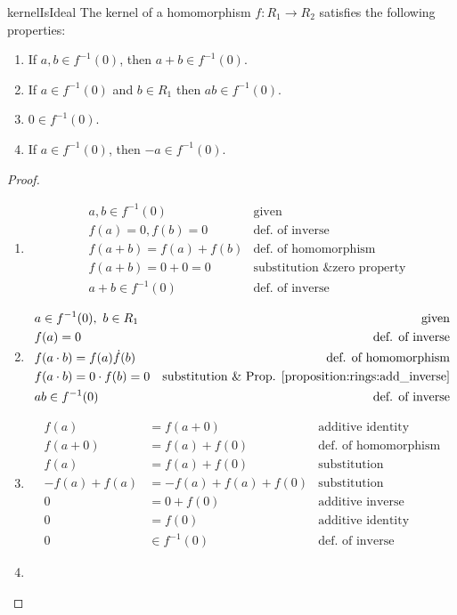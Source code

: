 \begin{prop}{kernelIsIdeal}
The kernel of a homomorphism $f:R_1\rightarrow R_2$ satisfies the following properties:
\begin{enumerate}
\item If $a,b\in f^{-1}(0)$, then $a+b\in f^{-1}(0)$.
\item If $a\in f^{-1}(0)$ and $b\in R_1$ then $ab\in f^{-1}(0)$.
\item $0\in f^{-1}(0)$.
\item If $a\in f^{-1}(0)$, then $-a\in f^{-1}(0)$.
\end{enumerate}

\begin{proof}
\begin{enumerate}
\item
\begin{align*}
&a,b\in f^{-1}(0) & \text{given}\\
&f(a)=0,f(b)=0 & \text{def. of inverse}\\
&f(a+b)=f(a)+f(b) & \text{def. of homomorphism}\\
&f(a+b)=0+0=0 & \text{substitution \& zero property}\\
&a+b\in f^{-1}(0) & \text{def. of inverse}
\end{align*}
\item
\begin{align*}
&a\in f^{-1}(0),~b\in R_1 & \text{given}\\
&f(a)=0 & \text{def. of inverse}\\
&f(a\cdot b)=f(a)\dot f(b) & \text{def. of homomorphism}\\
&f(a\cdot b)=0\cdot f(b)=0 & \text{substitution \& Prop. \ref{proposition:rings:add_inverse}}\\
&ab\in f^{-1}(0) & \text{def. of inverse}
\end{align*}
\item
\begin{align*}
f(a)&=f(a+0) & \text{additive identity}\\
f(a+0)&=f(a)+f(0) & \text{def. of homomorphism}\\
f(a)&=f(a)+f(0) & \text{substitution}\\
-f(a)+f(a)&=-f(a)+f(a)+f(0) & \text{substitution}\\
0&=0+f(0) & \text{additive inverse}\\
0&=f(0) & \text{additive identity}\\
0&\in f^{-1}(0) & \text{def. of inverse}
\end{align*}
\item

\end{enumerate}
\end{proof}
\end{prop}

